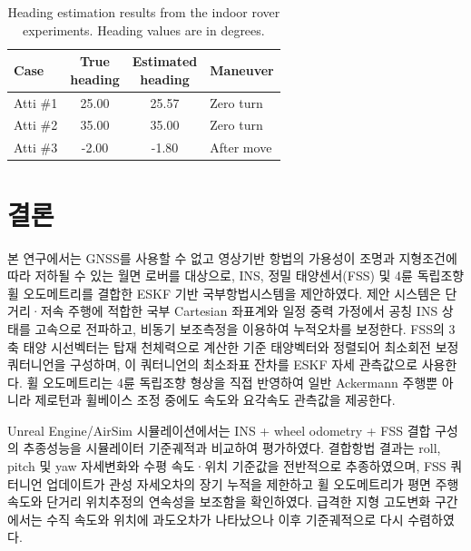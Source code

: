 \documentclass[]{IAC_style}
\begin{document}
\begin{table}[!t]
\centering
\caption{Heading estimation results from the indoor rover experiments. Heading values are in degrees.}
\label{tab:heading_results}
\scriptsize
\setlength{\tabcolsep}{3.2pt}
\renewcommand{\arraystretch}{1.10}
\begin{tabularx}{\columnwidth}{lcc>{\centering\arraybackslash}X}
\toprule
\textbf{Case} & \shortstack{\textbf{True}\\\textbf{heading}} & \shortstack{\textbf{Estimated}\\\textbf{heading}} & \textbf{Maneuver} \\
\midrule
Atti \#1 &  25.00 &  25.57 & Zero turn \\
Atti \#2 &  35.00 &  35.00 & Zero turn \\
Atti \#3 &  -2.00 &  -1.80 & After move \\
\bottomrule
\end{tabularx}
\end{table}

\FloatBarrier
\section{결론}

본 연구에서는 GNSS를 사용할 수 없고 영상기반 항법의 가용성이 조명과 지형조건에 따라 저하될 수 있는 월면 로버를 대상으로, INS, 정밀 태양센서(FSS) 및 4륜 독립조향 휠 오도메트리를 결합한 ESKF 기반 국부항법시스템을 제안하였다. 제안 시스템은 단거리·저속 주행에 적합한 국부 Cartesian 좌표계와 일정 중력 가정에서 공칭 INS 상태를 고속으로 전파하고, 비동기 보조측정을 이용하여 누적오차를 보정한다. FSS의 3축 태양 시선벡터는 탑재 천체력으로 계산한 기준 태양벡터와 정렬되어 최소회전 보정 쿼터니언을 구성하며, 이 쿼터니언의 최소좌표 잔차를 ESKF 자세 관측값으로 사용한다. 휠 오도메트리는 4륜 독립조향 형상을 직접 반영하여 일반 Ackermann 주행뿐 아니라 제로턴과 휠베이스 조정 중에도 속도와 요각속도 관측값을 제공한다.

Unreal Engine/AirSim 시뮬레이션에서는 INS + wheel odometry + FSS 결합 구성의 추종성능을 시뮬레이터 기준궤적과 비교하여 평가하였다. 결합항법 결과는 roll, pitch 및 yaw 자세변화와 수평 속도·위치 기준값을 전반적으로 추종하였으며, FSS 쿼터니언 업데이트가 관성 자세오차의 장기 누적을 제한하고 휠 오도메트리가 평면 주행속도와 단거리 위치추정의 연속성을 보조함을 확인하였다. 급격한 지형 고도변화 구간에서는 수직 속도와 위치에 과도오차가 나타났으나 이후 기준궤적으로 다시 수렴하였다.
\end{document}
